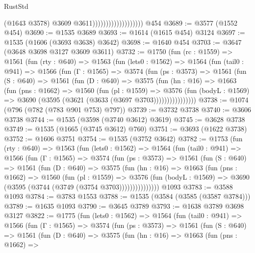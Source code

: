 \begin{lexlean}{RustStd}
\begin{coremodule}
                                          (@1643 @3578)
                                          @3609
                                          @3611)))))))))))))))))))
    @454
@3689 := @3577 (@1552 @454)
@3690 := @1535 @3689
@3693 := @1614 (@1615 @454) @3124
@3697 := @1535 (@1606 (@3693 @3638) @3642)
@3698 := @1640 @454
@3703 := @3647 (@3648 @3698 @3127 @3609 @3611)
@3732 := @1750
    (fun (rc : @1559) =>
    @1561
      (fun (rty : @640) =>
      @1563
        (fun (lets0 : @1562) =>
        @1564
          (fun (tail0 : @941) =>
          @1566
            (fun (Γ : @1565) =>
            @3574
              (fun (ps : @3573) =>
              @1561
                (fun (S : @640) =>
                @1561
                  (fun (D : @640) =>
                  @3575
                    (fun (hn : @16) =>
                    @1663
                      (fun (pns : @1662) =>
                      @1560
                        (fun (pl : @1559) =>
                        @3576
                          (fun (bodyL : @1569) =>
                          @3690 (@3595 (@3621 (@3633 (@3697 @3703))))))))))))))))
@3738 := @1074 (@796 (@782 (@783 @901 @753) @797))
@3739 := @3732 @3738
@3740 := @3606 @3738
@3744 := @1535 (@3598 (@3740 @3612) @3619)
@3745 := @3628 @3738
@3749 := @1535 (@1665 (@3745 @3612) @760)
@3751 := @3693 (@1622 @3738)
@3752 := @1606 @3751
@3754 := @1535 (@3752 @3642)
@3782 := @1753
    (fun (rty : @640) =>
    @1563
      (fun (lets0 : @1562) =>
      @1564
        (fun (tail0 : @941) =>
        @1566
          (fun (Γ : @1565) =>
          @3574
            (fun (ps : @3573) =>
            @1561
              (fun (S : @640) =>
              @1561
                (fun (D : @640) =>
                @3575
                  (fun (hn : @16) =>
                  @1663
                    (fun (pns : @1662) =>
                    @1560
                      (fun (pl : @1559) =>
                      @3576
                        (fun (bodyL : @1569) =>
                        @3690 (@3595 (@3744 (@3749 (@3754 @3703)))))))))))))))
    @1093
@3783 := @3588 @1093
@3784 := @3783 @1553
@3788 := @1535 (@3584 (@3585 (@3587 @3784)))
@3789 := @1635 @1093
@3790 := @3645 @3789
@3793 := @1638 @3789 @3698 @3127
@3822 := @1775
    (fun (lets0 : @1562) =>
    @1564
      (fun (tail0 : @941) =>
      @1566
        (fun (Γ : @1565) =>
        @3574
          (fun (ps : @3573) =>
          @1561
            (fun (S : @640) =>
            @1561
              (fun (D : @640) =>
              @3575
                (fun (hn : @16) =>
                @1663
                  (fun (pns : @1662) =>

\end{coremodule}
\end{lexlean}
